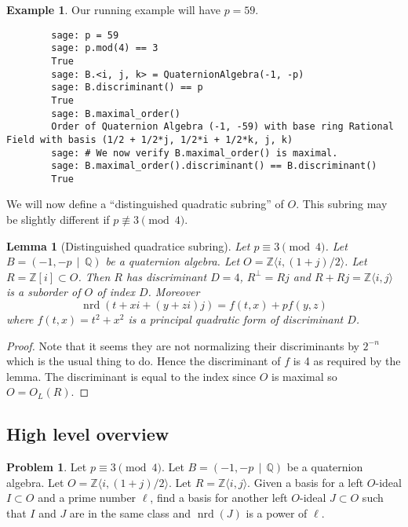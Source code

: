 \documentclass[10pt]{article}
\theoremstyle{plain}
\newtheorem{lemma}[theorem]{Lemma}
\theoremstyle{definition}
\newtheorem{example}[theorem]{Example}
\newtheorem{problem}[theorem]{Problem}
\newcommand{\op}{\operatorname}
\newcommand{\Z}{\mathbb{Z}}
\newcommand{\Q}{\mathbb{Q}}
\newcommand{\nrd}{\op{nrd}}
\begin{document}
\begin{example}
    Our running example will have \( p = 59 \).
    \begin{lstlisting}
        sage: p = 59
        sage: p.mod(4) == 3
        True 
        sage: B.<i, j, k> = QuaternionAlgebra(-1, -p)
        sage: B.discriminant() == p
        True
        sage: B.maximal_order()
        Order of Quaternion Algebra (-1, -59) with base ring Rational Field with basis (1/2 + 1/2*j, 1/2*i + 1/2*k, j, k)
        sage: # We now verify B.maximal_order() is maximal.
        sage: B.maximal_order().discriminant() == B.discriminant()
        True
    \end{lstlisting}
\end{example}

We will now define a ``distinguished quadratic subring'' of \( O \).
This subring may be slightly different if \( p \not\equiv 3 \pmod{4} \).

\begin{lemma}[Distinguished quadratice subring]
    Let \( p \equiv 3 \pmod{4} \).
    Let \( B =  (-1, -p \, \mid \, \Q) \) be a quaternion algebra.
    Let \( O = \Z \langle i, (1+j) / 2 \rangle \).
    Let \( R = \Z[i] \subset O \).
    Then \( R \) has discriminant \( D = 4 \), \( R^\perp = Rj \) and \( R + Rj = \Z\langle i, j \rangle\) is a suborder of \( O \) of index \( D \).
    Moreover
    \[
        \nrd(t + xi + (y + zi)j) = f(t, x) + p f(y, z)
    \]
    where \( f(t, x) = t^2 + x^2 \) is a principal quadratic form of discriminant \( D \).
\end{lemma}
\begin{proof}
    Note that it seems they are not normalizing their discriminants by \( 2^{-n} \) which is the usual thing to do.
    Hence the discriminant of \( f \) is 4 as required by the lemma.
    The discriminant is equal to the index since \( O \) is maximal so \( O = O_L(R) \).
\end{proof}

\subsection{High level overview}

\begin{problem}
Let \( p \equiv 3 \pmod{4} \).
Let \( B =  (-1, -p \, \mid \, \Q) \) be a quaternion algebra.
Let \( O = \Z \langle i, (1+j) / 2 \rangle \).
Let \( R = \Z \langle i , j \rangle \).
Given a basis for a left \( O \)-ideal \( I \subset O \) and a prime number \( \ell \), find a basis for another left \( O \)-ideal \( J \subset O \) such that \( I \) and \( J \) are in the same class and \( \nrd(J) \) is a power of \( \ell \).
\end{problem}
\end{document}
